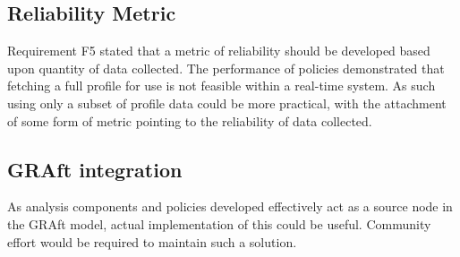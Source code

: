 \subsection{Reliability Metric}

Requirement F5 stated that a metric of reliability should be developed based upon quantity of data collected. The performance of policies demonstrated that fetching a full profile for use is not feasible within a real-time system. As such using only a subset of profile data could be more practical, with the attachment of some form of metric pointing to the reliability of data collected.

\subsection{GRAft integration}

As analysis components and policies developed effectively act as a source node in the GRAft model, actual implementation of this could be useful. Community effort would be required to maintain such a solution.